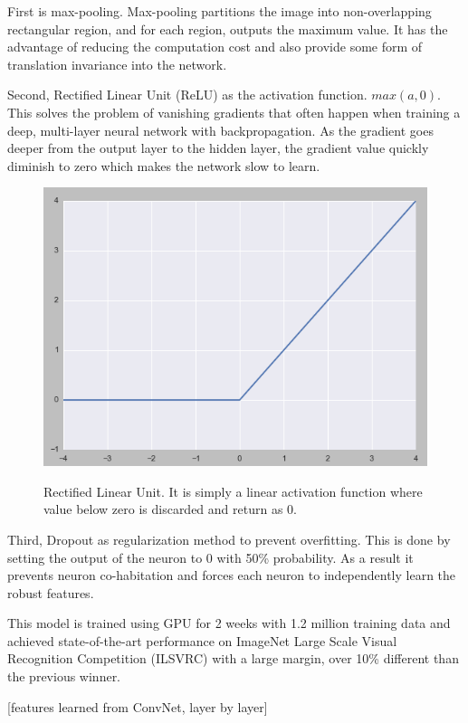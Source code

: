 \documentclass[a4paper,11pt]{kth-mag}
\begin{document}
First is max-pooling. Max-pooling partitions the image into non-overlapping rectangular region, and for each region, outputs the maximum value. It has the advantage of reducing the computation cost and also provide some form of translation invariance into the network.

Second, Rectified Linear Unit (ReLU) as the activation function. $max(a, 0)$. This solves the problem of vanishing gradients that often happen when training a deep, multi-layer neural network with backpropagation. As the gradient goes deeper from the output layer to the hidden layer, the gradient value quickly diminish to zero which makes the network slow to learn.

\begin{figure}
\centering
\includegraphics[scale=0.5]{image/relu.png}
\label{fig:relu}
\caption{Rectified Linear Unit. It is simply a linear activation function where value below zero is discarded and return as 0.}
\end{figure}

Third, Dropout as regularization method to prevent overfitting. This is done by setting the output of the neuron to 0 with 50\% probability. As a result it prevents neuron co-habitation and forces each neuron to independently learn the robust features.

This model is trained using GPU for 2 weeks with 1.2 million training data and achieved state-of-the-art performance on ImageNet Large Scale Visual Recognition Competition (ILSVRC) \cite{alexnet} with a large margin, over 10\% different than the previous winner.

[features learned from ConvNet, layer by layer]
\end{document}
